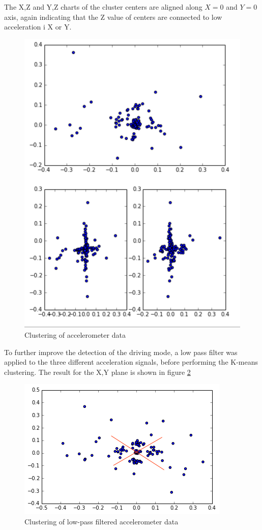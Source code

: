 The X,Z and Y,Z charts of the cluster centers are aligned along $X=0$ and $Y=0$ axis, again indicating that the Z value of centers are connected to low acceleration i X or Y.
\begin{figure}[h]
  \includegraphics[scale=0.5]{cluster_acc}
  \caption{Clustering of accelerometer data}
  \label{cluster}
\end{figure}

To further improve the detection of the driving mode, a low pass filter was applied to the three different acceleration signals, before performing the K-means clustering. The result for the X,Y plane is shown in figure \ref{cluster2}
\begin{figure}[h]
  \includegraphics[scale=0.5]{cluster_acc2}
  \caption{Clustering of low-pass filtered accelerometer data}
  \label{cluster2}
\end{figure}

